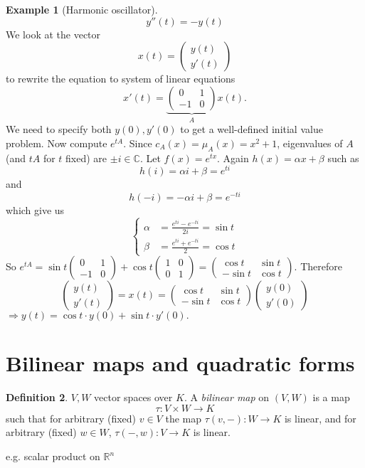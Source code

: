 \documentclass[a4paper]{article}
\theoremstyle{definition}
\newtheorem{defn}{Definition}[subsection]
\newtheorem{example}[defn]{Example}
\begin{document}
\begin{example}[Harmonic oscillator]
\[
y''(t)=-y(t)
\]
We look at the vector
\[
x(t)=\begin{pmatrix}y(t) \\ y'(t)\end{pmatrix}
\]
to rewrite the equation to system of linear equations
\[
x'(t)=\underbrace{\begin{pmatrix}0&1\\-1&0\end{pmatrix}}_{A}x(t) .
\]
We need to specify both $y(0),y'(0)$ to get a well-defined initial value problem. Now compute $e^{tA}$. Since $c_A(x)=\mu_A(x)=x^2+1$, eigenvalues of $A$ (and $tA$ for $t$ fixed) are $\pm i \in \mathbb C$. Let $f(x)=e^{tx}$. Again $h(x)=\alpha x+\beta$ such as
\[
h(i)=\alpha i+\beta = e^{ti}
\]
and
\[
h(-i)=-\alpha i+\beta = e^{-ti}
\]
which give us
\[
\left\{\begin{aligned}\alpha&=\frac{e^{ti}-e^{-ti}}{2i}=\sin t \\ \beta &= \frac{e^{ti}+e^{-ti}}{2}=\cos t \end{aligned}\right.
\]
So $e^{tA} = \sin t \begin{pmatrix}0&1\\-1&0\end{pmatrix}+\cos t \begin{pmatrix}1&0\\0&1\end{pmatrix} = \begin{pmatrix}\cos t&\sin t\\-\sin t&\cos t\end{pmatrix}$. Therefore
\[
\begin{pmatrix}y(t)\\y'(t)\end{pmatrix}=x(t)=\begin{pmatrix}\cos t&\sin t\\-\sin t&\cos t\end{pmatrix}\begin{pmatrix}y(0)\\y'(0)\end{pmatrix}
\]
$\Rightarrow y(t)=\cos t \cdot y(0)+\sin t\cdot y'(0) .$
\end{example}

\section{Bilinear maps and quadratic forms}
\begin{defn}
    $V,W$ vector spaces over $K$. A \textit{bilinear map} on $(V,W)$ is a map
\[
\tau :V\times W \rightarrow K
\]
such that for arbitrary (fixed) $v\in V$ the map $\tau (v,-): W\rightarrow K$ is linear, and for arbitrary (fixed) $w\in W$, $\tau (-,w):V\rightarrow K$ is linear.
\end{defn}
e.g. scalar product on $\mathbb R^n$
\end{document}

